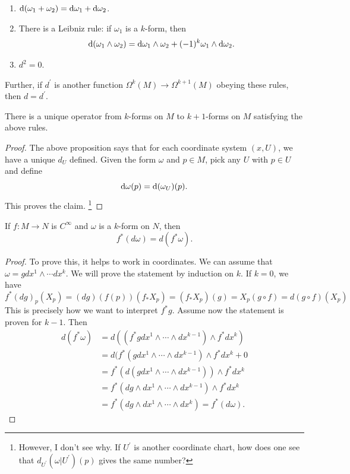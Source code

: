 \documentclass[11pt, english]{article}
\begin{document}
\begin{prop}
\begin{enumerate}
\item $\mathrm{d}{(}\omega_1 + \omega_ 2 ) = \mathrm{d}{\omega}_1 + \mathrm{d}{\omega}_2$.
\item There is a Leibniz rule: if $\omega_1$ is a $k$-form, then
\[
\mathrm{d}{(}\omega_1 \wedge \omega_2) = \mathrm{d}{\omega}_1 \wedge \omega_2 + (-1)^k \omega_1 \wedge \mathrm{d}{\omega}_2.
\]
\item $d^2=0$.
\end{enumerate}
Further, if $d^\prime$ is another function $\Omega^k(M) \to \Omega^{k+1}(M)$ obeying these rules, then $d=d^\prime$. 
\end{prop}

\begin{corr}
There is a unique operator from $k$-forms on $M$ to $k+1$-forms on $M$ satisfying the above rules.
\end{corr}
\begin{proof}
The above proposition says that for each coordinate system $(x,U)$, we have a unique $d_U$ defined. Given the form $\omega$ and $p \in M$, pick any $U$ with $p \in U$ and define
\[
\mathrm{d}{\omega}(p) = \mathrm{d}{(}\omega_{U})(p).
\]
This proves the claim. \footnote{However, I don't see why. If $U^\prime$ is another coordinate chart, how does one see that $d_{U^\prime}(\omega |U^\prime)(p)$ gives the same number?}

\end{proof}

\begin{prop}
\label{pullbackcomm}
If $f:M \to N$ is $C^\infty$ and $\omega$ is a $k$-form on $N$, then 
\[
f^\ast (d \omega) = d(f^\ast \omega).
 \]
 \end{prop}
\begin{proof}
To prove this, it helps to work in coordinates. We can assume that $\omega=g dx^1 \wedge \cdots dx^k$. We will prove the statement by induction on $k$. If $k=0$, we have
\[
f^\ast (dg)_p(X_p) = (dg)(f(p))(f_\ast X_p) = (f_\ast X_p)(g) = X_p(g \circ f) = d(g \circ f)(X_p)
\]
This is precisely how we want to interpret $f^\ast g$. Assume now the statement is proven for $k-1$. Then
\begin{align*}
  d(f^\ast \omega) &= d((f^\ast g dx^1 \wedge \cdots \wedge dx^{k-1}) \wedge f^\ast dx^k) \\
&= d(f^\ast(g dx^1 \wedge \cdots \wedge dx^{k-1}) \wedge f^\ast dx^k + 0 \\
&= f^\ast (d(g dx^1 \wedge \cdots \wedge dx^{k-1})) \wedge f^\ast dx^k \\
&= f^\ast (dg \wedge dx^1 \wedge \cdots \wedge dx^{k-1}) \wedge f^\ast dx^k \\
&= f^\ast(dg \wedge dx^1 \wedge \cdots \wedge dx^k) = f^\ast (d \omega).
\end{align*}
\end{proof} 
\end{document}
